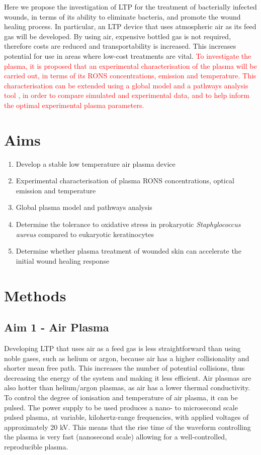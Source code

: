 \documentclass[11pt, oneside]{article}   	%
\begin{document}
Here we propose the investigation of LTP for the treatment of bacterially infected wounds, in terms of its ability to eliminate bacteria, and promote the wound healing process.
In particular, an LTP device that uses atmospheric air as its feed gas will be developed.
By using air, expensive bottled gas is not required, therefore costs are reduced and transportability is increased. 
This increases potential for use in areas where low-cost treatments are vital.
\textcolor{red}{To investigate the plasma, it is proposed that an experimental characterisation of the plasma will be carried out, in terms of its RONS concentrations, emission and temperature. 
This characterisation can be extended using a global model and a pathways analysis tool \cite{Stafford2004O2, Markosyan2014PumpKin}, in order to compare simulated and experimental data, and to help inform the optimal experimental plasma parameters.}



\section*{Aims}
\begin{enumerate}
\item Develop a stable low temperature air plasma device
\item Experimental characterisation of plasma RONS concentrations, optical emission and temperature
\item Global plasma model and pathways analysis
\item Determine the tolerance to oxidative stress in prokaryotic \textit{Staphylococcus aureus} compared to eukaryotic keratinocytes
\item Determine whether plasma treatment of wounded skin can accelerate the initial wound healing response
\end{enumerate}

\section*{Methods}
\subsection*{Aim 1 - Air Plasma}

Developing LTP that uses air as a feed gas is less straightforward than using noble gases, such as helium or argon, because air has a higher collisionality and shorter mean free path.
This increases the number of potential collisions, thus decreasing the energy of the system and making it less efficient.
Air plasmas are also hotter than helium/argon plasmas, as air has a lower thermal conductivity.
To control the degree of ionisation and temperature of air plasma, it can be pulsed.
The power supply to be used produces a nano- to microsecond scale pulsed plasma, at variable, kilohertz-range frequencies, with applied voltages of approximately 20 kV. 
This means that the rise time of the waveform controlling the plasma is very fast (nanosecond scale) allowing for a well-controlled, reproducible plasma.
\end{document}
